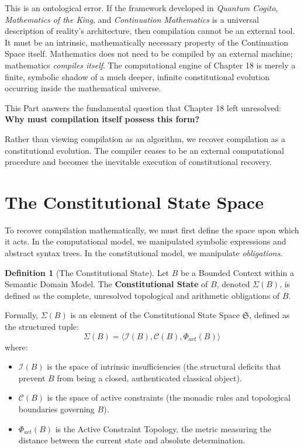 \documentclass[12pt,openany]{extbook}
\theoremstyle{plain}
\theoremstyle{definition}
\newtheorem{definition}{Definition}[chapter]
\begin{document}
This is an ontological error. If the framework developed in \emph{Quantum Cogito}, \emph{Mathematics of the King}, and \emph{Continuation Mathematics} is a universal description of reality's architecture, then compilation cannot be an external tool. It must be an intrinsic, mathematically necessary property of the Continuation Space itself. Mathematics does not need to be compiled by an external machine; mathematics \emph{compiles itself}. The computational engine of Chapter 18 is merely a finite, symbolic shadow of a much deeper, infinite constitutional evolution occurring inside the mathematical universe.

This Part answers the fundamental question that Chapter 18 left unresolved: \textbf{Why must compilation itself possess this form?}

Rather than viewing compilation as an algorithm, we recover compilation as a constitutional evolution. The compiler ceases to be an external computational procedure and becomes the inevitable execution of constitutional recovery. 

\section{The Constitutional State Space}

To recover compilation mathematically, we must first define the space upon which it acts. In the computational model, we manipulated symbolic expressions and abstract syntax trees. In the constitutional model, we manipulate \emph{obligations}.

\begin{definition}[The Constitutional State]
Let $B$ be a Bounded Context within a Semantic Domain Model. The \textbf{Constitutional State} of $B$, denoted $\Sigma(B)$, is defined as the complete, unresolved topological and arithmetic obligations of $B$. 

Formally, $\Sigma(B)$ is an element of the Constitutional State Space $\mathfrak{S}$, defined as the structured tuple:
\[
\Sigma(B) = \langle \mathcal{I}(B), \mathcal{C}(B), \Phi_{act}(B) \rangle
\]
where:
\begin{itemize}
    \item $\mathcal{I}(B)$ is the space of intrinsic insufficiencies (the structural deficits that prevent $B$ from being a closed, authenticated classical object).
    \item $\mathcal{C}(B)$ is the space of active constraints (the monadic rules and topological boundaries governing $B$).
    \item $\Phi_{act}(B)$ is the Active Constraint Topology, the metric measuring the distance between the current state and absolute determination.
\end{itemize}
\end{definition}
\end{document}
